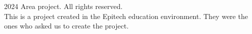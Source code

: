 \documentclass{article}
\begin{document}
\footer
    \begin{minipage}{\textwidth}
        \small \textcopyright{} 2024 Area project. All rights reserved. \\
        \small This is a project created in the Epitech education environment.
        \small They were the ones who asked us to create the project.
    \end{minipage}
\endfooter
\end{document}
